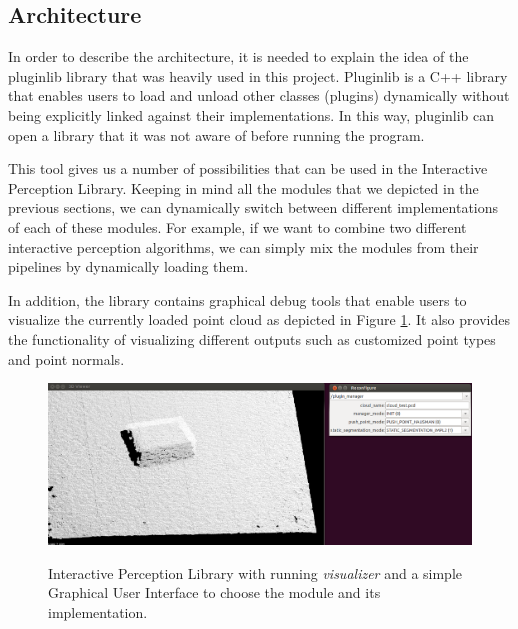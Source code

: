 \subsection{Architecture}

In order to describe the architecture, it is needed to explain the idea of the pluginlib library that was heavily used in this project. Pluginlib is a C++ library that enables users to load and unload other classes (plugins) dynamically without being explicitly linked against their implementations. In this way, pluginlib can open a library that it was not aware of before running the program. 

This tool gives us a number of possibilities that can be used in the Interactive Perception Library. Keeping in mind all the modules that we depicted in the previous sections, we can dynamically switch between different implementations of each of these modules. For example, if we want to combine two different interactive perception algorithms, we can simply mix the modules from their pipelines by dynamically loading them. 

In addition, the library contains graphical debug tools that enable users to visualize the currently loaded point cloud as depicted in Figure \ref{fig:ipl}. It also provides the functionality of visualizing different outputs such as customized point types and point normals.

\begin{figure}

{\includegraphics[width=1\columnwidth]{figures/ipl.png}}

\caption{Interactive Perception Library with running \textit{visualizer} and a simple Graphical User Interface to choose the module and its implementation.}
\label{fig:ipl}
\end{figure}

